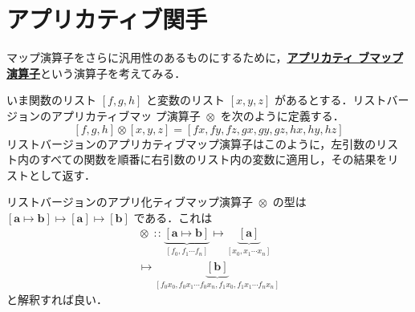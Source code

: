 \documentclass[a5paper,twoside,fleqn]{jsbook}
\def\[{\left[\!\left[}
\def\]{\right]\!\right]}
\newcommand{\programminglanguage}[1]{\textsf{#1}}
\newcommand{\haskell}{\programminglanguage{Haskell}}
\newcommand{\keyword}[1]{{\underline{\textbf{#1}}}}
\newcommand{\code}[1]{\texttt{#1}}
\DeclareMathOperator{\mAppMapList}{\otimes}
\DeclareMathOperator{\mIn}{{:\!:}}
\DeclareMathOperator{\mMap}{\bullet}
\DeclareMathOperator{\mMapList}{\odot}
\DeclareMathOperator{\mMapMaybe}{\boxdot}
\DeclareMathOperator{\mMapsTo}{\mapsto}
\newcommand{\mType}[1]{\mathbf{#1}}
\newcommand{\mListType}[1]{[\mType{#1}]}
\newcommand{\mGenericTypeAssemble}[2]{{}^{\mTypeConstructor{#1}}\[\mType{#2}\]}
\newcommand{\mMaybeType}[1]{\mGenericTypeAssemble{Maybe}{#1}}
\newcommand{\mTypeConstructor}[1]{\textit{#1}}
\newcommand{\mListWith}[1]{\left[#1\right]}
\newcommand{\mGenericTypeClass}[1]{\textsc{#1}} %
\newcommand{\mFunctorTypeClass}{\mGenericTypeClass{Functor}}
\newcommand{\mList}[1]{{#1}^\mathrm{\star}}
\newcommand{\mMaybe}[1]{{#1}^?}
\newcommand{\mProj}[2]{#1\mMapsTo#2}
\begin{document}






\section{アプリカティブ関手}

マップ演算子をさらに汎用性のあるものにするために，\keyword{アプリカティ
  ブマップ演算子}という演算子を考えてみる．

いま関数のリスト $\mListWith{f,g,h}$ と変数のリスト
$\mListWith{x,y,z}$ があるとする．リストバージョンのアプリカティブマッ
プ演算子 $\mAppMapList$ を次のように定義する．
\begin{equation}
\mListWith{f,g,h}\mAppMapList\mListWith{x,y,z}
=\mListWith{fx,fy,fz,gx,gy,gz,hx,hy,hz}
\end{equation}
リストバージョンのアプリカティブマップ演算子はこのように，左引数のリス
ト内のすべての関数を順番に右引数のリスト内の変数に適用し，その結果をリ
ストとして返す．

リストバージョンのアプリ化ティブマップ演算子 $\mAppMapList$ の型は
$\mProj{\mListType{\mProj{\mType{a}}{\mType{b}}}}{\mProj{\mListType{\mType{a}}}{\mListType{\mType{b}}}}$
である．これは
\begin{multline}
\mAppMapList\mIn
\underbrace{\mListWith{\mType{a}\mapsto\mType{b}}}_{\mListWith{f_0,f_1\dotsb f_n}}
\mapsto
\underbrace{\mListType{a}}_{\mListWith{x_0,x_1\dotsb x_n}}\\
\mapsto
\underbrace{\mListType{\mType{b}}}_{\mListWith{f_0x_0,f_0x_1\dotsb f_0x_n,f_1x_0,f_1x_1\dotsb f_nx_n}}
\end{multline}
と解釈すれば良い．
\end{document}
